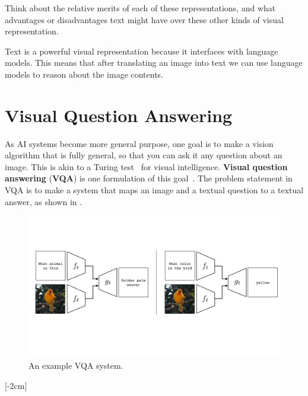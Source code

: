 Think about the relative merits of each of these representations, and what advantages or disadvantages text might have over these other kinds of visual representation.

Text is a powerful visual representation because it interfaces with language models. This means that after translating an image into text we can use language models to reason about the image contents.


\section{Visual Question Answering}

As AI systems become more general purpose, one goal is to make a vision algorithm that is fully general, so that you can ask it any question about an image. This is akin to a Turing test~\cite{turing2009computing} for visual intelligence. \textbf{Visual question answering} (\textbf{VQA}) is one formulation of this goal~\cite{antol2015vqa}. The problem statement in VQA is to make a system that maps an image and a textual question to a textual answer, as shown in \fig{\ref{fig:vision_and_language:VQA_examples}}.
\begin{figure}
    \centerline{
    \includegraphics[width=1.0\linewidth]{figures/vision_and_language/VQA_examples.pdf}
    }
    \caption{An example VQA system.}
    \label{fig:vision_and_language:VQA_examples}
\end{figure}

[-2cm]

